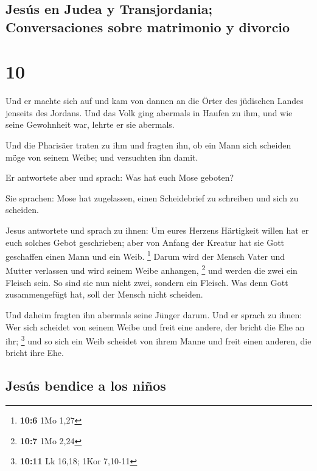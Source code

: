 \hypertarget{jesuxfas-en-judea-y-transjordania-conversaciones-sobre-matrimonio-y-divorcio}{%
\subsection{Jesús en Judea y Transjordania; Conversaciones sobre
matrimonio y
divorcio}\label{jesuxfas-en-judea-y-transjordania-conversaciones-sobre-matrimonio-y-divorcio}}

\hypertarget{section-9}{%
\section{10}\label{section-9}}

 Und er machte sich auf und kam von dannen an die Örter
des jüdischen Landes jenseits des Jordans. Und das Volk ging abermals in
Haufen zu ihm, und wie seine Gewohnheit war, lehrte er sie abermals.

 Und die Pharisäer traten zu ihm und fragten ihn, ob ein
Mann sich scheiden möge von seinem Weibe; und versuchten ihn damit.

 Er antwortete aber und sprach: Was hat euch Mose geboten?

 Sie sprachen: Mose hat zugelassen, einen Scheidebrief zu
schreiben und sich zu scheiden.

 Jesus antwortete und sprach zu ihnen: Um eures Herzens
Härtigkeit willen hat er euch solches Gebot geschrieben; 
aber von Anfang der Kreatur hat sie Gott geschaffen einen Mann und ein
Weib. \footnote{\textbf{10:6} 1Mo 1,27}  Darum wird der
Mensch Vater und Mutter verlassen und wird seinem Weibe anhangen,
\footnote{\textbf{10:7} 1Mo 2,24}  und werden die zwei ein
Fleisch sein. So sind sie nun nicht zwei, sondern ein Fleisch.
 Was denn Gott zusammengefügt hat, soll der Mensch nicht
scheiden.

 Und daheim fragten ihn abermals seine Jünger darum.
 Und er sprach zu ihnen: Wer sich scheidet von seinem
Weibe und freit eine andere, der bricht die Ehe an ihr; \footnote{\textbf{10:11}
  Lk 16,18; 1Kor 7,10-11}  und so sich ein Weib scheidet
von ihrem Manne und freit einen anderen, die bricht ihre Ehe.

\hypertarget{jesuxfas-bendice-a-los-niuxf1os}{%
\subsection{Jesús bendice a los
niños}\label{jesuxfas-bendice-a-los-niuxf1os}}

